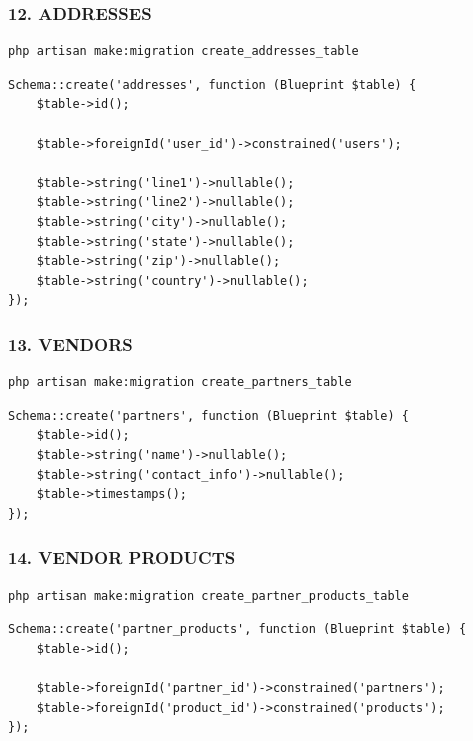 \documentclass[12pt,a4paper]{article}
\begin{document}
\subsubsection{12. ADDRESSES}
\begin{verbatim}
php artisan make:migration create_addresses_table
\end{verbatim}

\begin{verbatim}
Schema::create('addresses', function (Blueprint $table) {
    $table->id();

    $table->foreignId('user_id')->constrained('users');

    $table->string('line1')->nullable();
    $table->string('line2')->nullable();
    $table->string('city')->nullable();
    $table->string('state')->nullable();
    $table->string('zip')->nullable();
    $table->string('country')->nullable();
});
\end{verbatim}

\subsubsection{13. VENDORS}
\begin{verbatim}
php artisan make:migration create_partners_table
\end{verbatim}

\begin{verbatim}
Schema::create('partners', function (Blueprint $table) {
    $table->id();
    $table->string('name')->nullable();
    $table->string('contact_info')->nullable();
    $table->timestamps();
});
\end{verbatim}

\subsubsection{14. VENDOR PRODUCTS}
\begin{verbatim}
php artisan make:migration create_partner_products_table
\end{verbatim}

\begin{verbatim}
Schema::create('partner_products', function (Blueprint $table) {
    $table->id();

    $table->foreignId('partner_id')->constrained('partners');
    $table->foreignId('product_id')->constrained('products');
});
\end{verbatim}%
\end{document}
